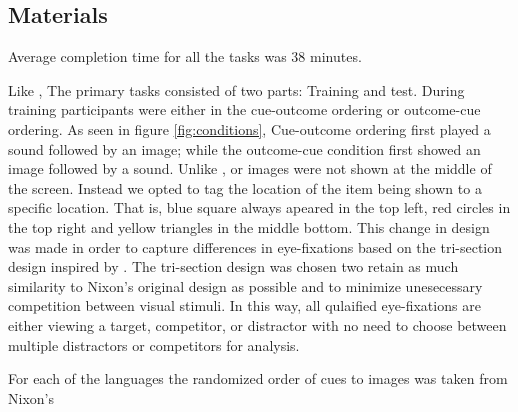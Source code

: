 \subsection{Materials}

Average completion time for all the tasks was 38 minutes.

Like \cite{nixon2020mice}, The primary tasks consisted of two parts: Training and test. During training participants were either in the cue-outcome ordering or outcome-cue ordering. As seen in figure \ref{fig:conditions}, Cue-outcome ordering first played a sound followed by an image; while the outcome-cue condition first showed an image followed by a sound. Unlike \cite{nixon2020mice}, or images were not shown at the middle of the screen. Instead we opted to tag the location of the item being shown to a specific location. That is, blue square always apeared in the top left, red circles in the top right and yellow triangles in the middle bottom. This change in design was made in order to capture differences in eye-fixations based on the tri-section design inspired by \cite{gruter2020classifiers}. The tri-section design was chosen two retain as much similarity to Nixon's original design as possible and to minimize unesecessary competition between visual stimuli. In this way, all qulaified eye-fixations are either viewing a target, competitor, or distractor with no need to choose between multiple distractors or competitors for analysis. 

For each of the languages the randomized order of cues to images was taken from Nixon's 




